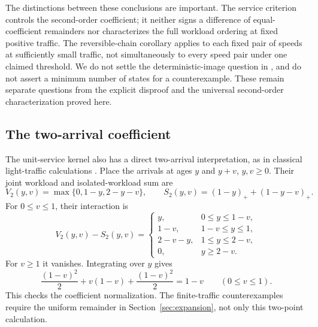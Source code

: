 \documentclass[aap,preprint]{imsart}
\numberwithin{equation}{section}
\theoremstyle{plain}
\theoremstyle{definition}
\newcommand{\1}{\mathbf 1}
\begin{document}
The distinctions between these conclusions are important. The service criterion controls the second-order coefficient; it neither signs a difference of equal-coefficient remainders nor characterizes the full workload ordering at fixed positive traffic. The reversible-chain corollary applies to each fixed pair of speeds at sufficiently small traffic, not simultaneously to every speed pair under one claimed threshold. We do not settle the deterministic-image question in \cite[Problem~2]{Leskela22}, and do not assert a minimum number of states for a counterexample. These remain separate questions from the explicit disproof and the universal second-order characterization proved here.

\begin{appendix}
\section{The two-arrival coefficient}\label{app:pairs}
The unit-service kernel also has a direct two-arrival interpretation, as in classical light-traffic calculations \cite{RS89,Blasz95}. Place the arrivals at ages $y$ and $y+v$, $y,v\ge0$. Their joint workload and isolated-workload sum are
\[
 V_2(y,v)=\max\{0,1-y,2-y-v\},\qquad
 S_2(y,v)=(1-y)_++(1-y-v)_+.
\]
For $0\le v\le1$, their interaction is
\[
 V_2(y,v)-S_2(y,v)=
 \begin{cases}
 y,&0\le y\le1-v,\\
 1-v,&1-v\le y\le1,\\
 2-v-y,&1\le y\le2-v,\\
 0,&y\ge2-v.
 \end{cases}
\]
For $v\ge1$ it vanishes. Integrating over $y$ gives
\[
 \frac{(1-v)^2}{2}+v(1-v)+\frac{(1-v)^2}{2}=1-v
 \qquad(0\le v\le1).
\]
This checks the coefficient normalization. The finite-traffic counterexamples require the uniform remainder in Section~\ref{sec:expansion}, not only this two-point calculation.


\end{appendix}
\end{document}
